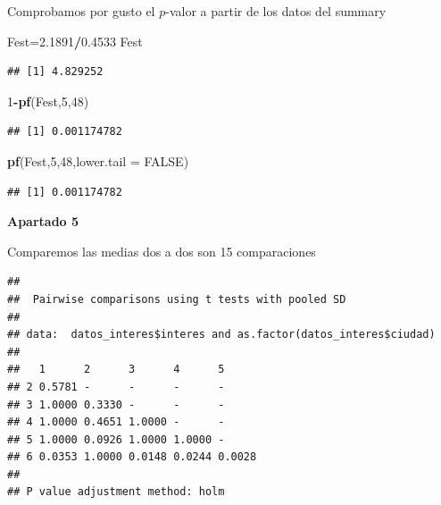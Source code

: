 \documentclass[
]{article}
\newenvironment{Shaded}{\begin{snugshade}}{\end{snugshade}}
\newcommand{\DataTypeTok}[1]{\textcolor[rgb]{0.13,0.29,0.53}{#1}}
\newcommand{\DecValTok}[1]{\textcolor[rgb]{0.00,0.00,0.81}{#1}}
\newcommand{\FloatTok}[1]{\textcolor[rgb]{0.00,0.00,0.81}{#1}}
\newcommand{\KeywordTok}[1]{\textcolor[rgb]{0.13,0.29,0.53}{\textbf{#1}}}
\newcommand{\NormalTok}[1]{#1}
\newcommand{\OperatorTok}[1]{\textcolor[rgb]{0.81,0.36,0.00}{\textbf{#1}}}
\newcommand{\OtherTok}[1]{\textcolor[rgb]{0.56,0.35,0.01}{#1}}
\newcommand{\StringTok}[1]{\textcolor[rgb]{0.31,0.60,0.02}{#1}}
\begin{document}
Comprobamos por gusto el \(p\)-valor a partir de los datos del summary

\begin{Shaded}
\begin{Highlighting}[]
\NormalTok{Fest=}\FloatTok{2.1891}\OperatorTok{/}\FloatTok{0.4533}
\NormalTok{Fest}
\end{Highlighting}
\end{Shaded}

\begin{verbatim}
## [1] 4.829252
\end{verbatim}

\begin{Shaded}
\begin{Highlighting}[]
\DecValTok{1}\OperatorTok{{-}}\KeywordTok{pf}\NormalTok{(Fest,}\DecValTok{5}\NormalTok{,}\DecValTok{48}\NormalTok{)}
\end{Highlighting}
\end{Shaded}

\begin{verbatim}
## [1] 0.001174782
\end{verbatim}

\begin{Shaded}
\begin{Highlighting}[]
\KeywordTok{pf}\NormalTok{(Fest,}\DecValTok{5}\NormalTok{,}\DecValTok{48}\NormalTok{,}\DataTypeTok{lower.tail =} \OtherTok{FALSE}\NormalTok{)}
\end{Highlighting}
\end{Shaded}

\begin{verbatim}
## [1] 0.001174782
\end{verbatim}

\textbf{Apartado 5}

Comparemos las medias dos a dos son 15 comparaciones

\begin{Shaded}
\end{Shaded}

\begin{verbatim}
## 
##  Pairwise comparisons using t tests with pooled SD 
## 
## data:  datos_interes$interes and as.factor(datos_interes$ciudad) 
## 
##   1      2      3      4      5     
## 2 0.5781 -      -      -      -     
## 3 1.0000 0.3330 -      -      -     
## 4 1.0000 0.4651 1.0000 -      -     
## 5 1.0000 0.0926 1.0000 1.0000 -     
## 6 0.0353 1.0000 0.0148 0.0244 0.0028
## 
## P value adjustment method: holm
\end{verbatim}
\end{document}
